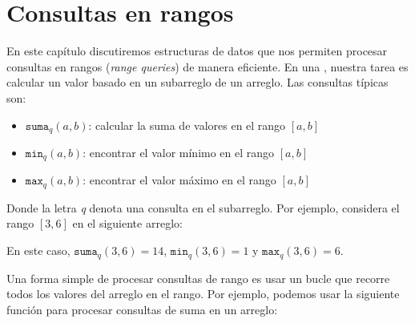 \chapter{Consultas en rangos}


En este capítulo discutiremos estructuras de datos
que nos permiten procesar consultas en rangos (\textit{range queries})
de manera eficiente. En una ,
nuestra tarea es calcular un valor
basado en un subarreglo de un arreglo.
Las consultas típicas son:
\begin{itemize}
    \item $\texttt{suma}_q(a,b)$: calcular la suma de valores en el rango $[a,b]$
    \item $\texttt{min}_q(a,b)$: encontrar el valor mínimo en el rango $[a,b]$
    \item $\texttt{max}_q(a,b)$: encontrar el valor máximo en el rango $[a,b]$
\end{itemize}

Donde la letra \textit{q} denota una consulta en el subarreglo. Por ejemplo, considera el rango $[3,6]$ en el siguiente arreglo:
\begin{center}
\end{center}
En este caso, $\texttt{suma}_q(3,6)=14$,
$\texttt{min}_q(3,6)=1$ y $\texttt{max}_q(3,6)=6$.

Una forma simple de procesar consultas de rango es usar
un bucle que recorre todos los valores del arreglo en el rango.
Por ejemplo, podemos usar la siguiente función para procesar
consultas de suma en un arreglo:

